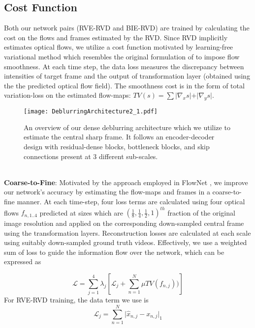 \documentclass[10pt,twocolumn,letterpaper]{article}
\begin{document}
\subsection{Cost Function}
\label{sec:Cost Function}
Both our network pairs (RVE-RVD and BIE-RVD) are trained by calculating the cost on the flows and frames estimated by the RVD. Since RVD implicitly estimates optical flows, we utilize a cost function motivated by learning-free variational method \cite{brox2011large} which resembles the original formulation of \cite{horn1981determining} to impose flow smoothness. At each time step, the data loss measures the discrepancy between intensities of target frame and the output of transformation layer (obtained using the the predicted optical flow field). The smoothness cost is in the form of total variation-loss on the estimated flow-maps: $TV(s)= \sum \vert{\nabla_x} s \vert + \vert{\nabla_y} s\vert $. 
\\
\begin{figure}
\begin{center}
   \texttt{[image: DeblurringArchitecture2\_1.pdf]}
\end{center}
\vspace{-4mm}
   \caption{An overview of our dense deblurring architecture which we utilize to estimate the central sharp frame. It follows an encoder-decoder design with residual-dense blocks, bottleneck blocks, and skip connections present at 3 different sub-scales.}
\label{fig:SID}
\end{figure}
\\
\textbf{Coarse-to-Fine}:  
Motivated by the approach employed in FlowNet \cite{dosovitskiy2015flownet}, we improve our network's accuracy by estimating the flow-maps and frames in a coarse-to-fine manner. At each time-step, four loss terms are calculated using four optical flows $f_{n,1..4}$ predicted at sizes which are $(\frac{1}{8},\frac{1}{4},\frac{1}{2},1)^{th}$ fraction of the original image resolution and applied on the corresponding down-sampled central frame using the transformation layers. 
Reconstruction losses are calculated at each scale using suitably down-sampled ground truth videos.  Effectively, we use a weighted sum of loss to guide the information flow over the network, which can be expressed as 

\begin{equation}
\mathcal{L} = \sum_{j=1}^{4} \lambda_j \left[  \mathcal{L}_j + \sum_{n=1}^{N} \mu TV(f_{n,j})) \right] 
\end{equation}
For RVE-RVD training, the data term we use is
\begin{equation}
\mathcal{L}_j = \sum_{n=1}^N \Big| \hat{x}_{n,j} - x_{n,j} \Big|_1
\end{equation}
\end{document}
